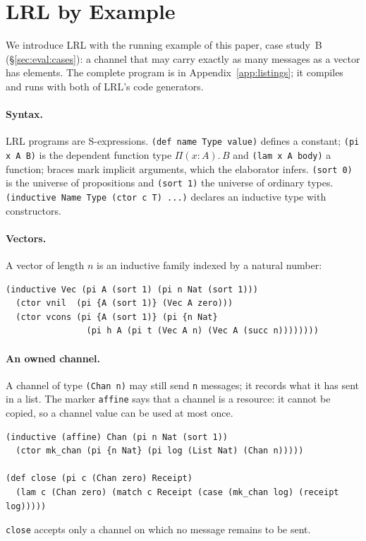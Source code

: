 \section{LRL by Example}\label{sec:tour}

We introduce LRL with the running example of this paper, case study~B (\S\ref{sec:eval:cases}): a channel that may carry exactly as many messages as a vector has elements.
The complete program is in Appendix~\ref{app:listings}; it compiles and runs with both of LRL's code generators.

\paragraph{Syntax.}
LRL programs are S-expressions.
\lstinline|(def name Type value)| defines a constant; \lstinline|(pi x A B)| is the dependent function type $\Pi(x{:}A).\,B$ and \lstinline|(lam x A body)| a function; braces mark implicit arguments, which the elaborator infers.
\lstinline|(sort 0)| is the universe of propositions and \lstinline|(sort 1)| the universe of ordinary types.
\lstinline|(inductive Name Type (ctor c T) ...)| declares an inductive type with constructors.

\paragraph{Vectors.}
A vector of length $n$ is an inductive family indexed by a natural number:
\begin{lstlisting}
(inductive Vec (pi A (sort 1) (pi n Nat (sort 1)))
  (ctor vnil  (pi {A (sort 1)} (Vec A zero)))
  (ctor vcons (pi {A (sort 1)} (pi {n Nat}
                (pi h A (pi t (Vec A n) (Vec A (succ n))))))))
\end{lstlisting}

\paragraph{An owned channel.}
A channel of type \lstinline|(Chan n)| may still send \lstinline|n| messages; it records what it has sent in a list.
The marker \lstinline|affine| says that a channel is a resource: it cannot be copied, so a channel value can be used at most once.
\begin{lstlisting}
(inductive (affine) Chan (pi n Nat (sort 1))
  (ctor mk_chan (pi {n Nat} (pi log (List Nat) (Chan n)))))

(def close (pi c (Chan zero) Receipt)
  (lam c (Chan zero) (match c Receipt (case (mk_chan log) (receipt log)))))
\end{lstlisting}
\lstinline|close| accepts only a channel on which no message remains to be sent.

